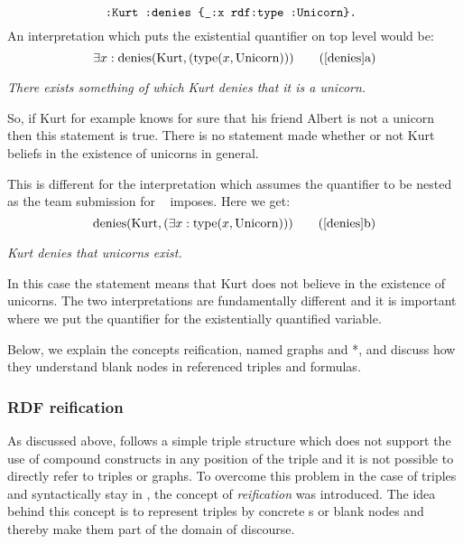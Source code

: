 % 
\begin{equation}\label{denies}
\verb!:Kurt :denies {_:x rdf:type :Unicorn}. !
\end{equation}
An interpretation which puts the existential quantifier on top level would be:
\[
\exists x : \text{denies}(\text{Kurt}, (\text{type}(x, \text{Unicorn})))\tag{\ref{denies}a} \label{dtop}
\]
\begin{center}\textit{
There exists something of which Kurt denies that it is a unicorn.
}
\end{center}
So, if Kurt for example knows for sure that his friend Albert is not a unicorn then this statement is true. There is no statement made whether or not Kurt beliefs 
in the existence of unicorns in general. 

This is different for the interpretation which assumes the quantifier to be nested as the \wwwc team submission for \nthree~\cite{Notation3} imposes. Here we get:
\[
 \text{denies}(\text{Kurt}, (\exists x : \text{type}(x, \text{Unicorn})))\tag{\ref{denies}b} \label{dnest}
\]
\begin{center}\textit{
Kurt denies that unicorns exist.
}
\end{center}
In this case the statement means that Kurt does not believe in the existence of unicorns. The two interpretations are fundamentally different and it is important where we put 
the quantifier for the existentially quantified variable.

Below, we explain the concepts \rdf reification, named graphs and \rdf{}*, and discuss how they understand blank nodes in referenced triples and formulas.






% 

\subsubsection{RDF reification}
As discussed above, \rdf follows a simple triple structure which does not support the use of compound constructs in any position of the triple and it is not possible 
to directly refer to triples or graphs. To overcome this problem in the case of triples and syntactically stay in \rdf, the concept of \emph{reification} was introduced. 
The idea behind this concept is to represent triples by concrete \iri{}s
or blank nodes
and thereby make them part of the domain of discourse. 


